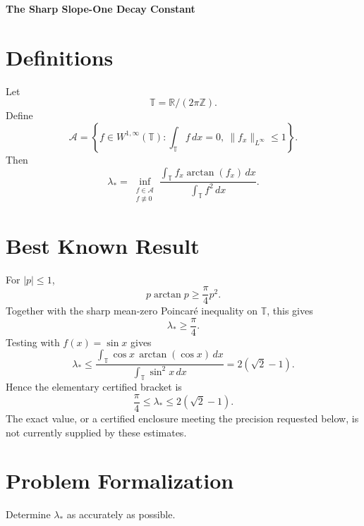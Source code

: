 \documentclass[10pt,a4paper]{article}
\theoremstyle{definition}
\begin{document}
\begin{center}
  {\Large\bfseries The Sharp Slope-One Decay Constant}
\end{center}

\section{Definitions}

Let
\[
  \mathbb T=\mathbb R/(2\pi\mathbb Z).
\]
Define
\begin{equation}
  \mathcal A
  =
  \left\{
    f\in W^{1,\infty}(\mathbb T):
    \int_{\mathbb T}f\,dx=0,
    \ \|f_x\|_{L^\infty}\leq 1
  \right\}.
\end{equation}
Then
\begin{equation}
  \lambda_*
  =
  \inf_{\substack{f\in\mathcal A\\f\not\equiv 0}}
  \frac{\displaystyle\int_{\mathbb T} f_x\arctan(f_x)\,dx}
       {\displaystyle\int_{\mathbb T} f^2\,dx}.
\end{equation}

\section{Best Known Result}

For $|p|\leq 1$,
\begin{equation}
  p\arctan p\geq \frac{\pi}{4}p^2.
\end{equation}
Together with the sharp mean-zero Poincar\'e inequality on $\mathbb T$, this
gives
\begin{equation}
  \lambda_*\geq \frac{\pi}{4}.
\end{equation}
Testing with $f(x)=\sin x$ gives
\begin{equation}
  \lambda_*
  \leq
  \frac{\displaystyle\int_{\mathbb T}\cos x\,\arctan(\cos x)\,dx}
       {\displaystyle\int_{\mathbb T}\sin^2x\,dx}
  =2(\sqrt 2-1).
\end{equation}
Hence the elementary certified bracket is
\begin{equation}
  \frac{\pi}{4}\leq\lambda_*\leq 2(\sqrt 2-1).
\end{equation}
The exact value, or a certified enclosure meeting the precision requested
below, is not currently supplied by these estimates.

\section{Problem Formalization}
Determine $\lambda_*$ as accurately as possible.
\end{document}
